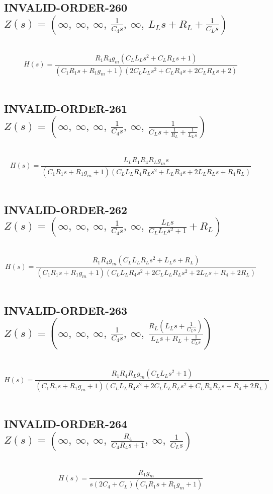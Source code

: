 \documentclass{article}
\begin{document}
\subsection{INVALID-ORDER-260 $Z(s) = \left( \infty, \  \infty, \  \infty, \  \frac{1}{C_{4} s}, \  \infty, \  L_{L} s + R_{L} + \frac{1}{C_{L} s}\right)$ } \ 
\textbf{\[H(s) = \frac{R_{1} R_{4} g_{m} \left(C_{L} L_{L} s^{2} + C_{L} R_{L} s + 1\right)}{\left(C_{1} R_{1} s + R_{1} g_{m} + 1\right) \left(2 C_{L} L_{L} s^{2} + C_{L} R_{4} s + 2 C_{L} R_{L} s + 2\right)}\] } \ 
\subsection{INVALID-ORDER-261 $Z(s) = \left( \infty, \  \infty, \  \infty, \  \frac{1}{C_{4} s}, \  \infty, \  \frac{1}{C_{L} s + \frac{1}{R_{L}} + \frac{1}{L_{L} s}}\right)$ } \ 
\textbf{\[H(s) = \frac{L_{L} R_{1} R_{4} R_{L} g_{m} s}{\left(C_{1} R_{1} s + R_{1} g_{m} + 1\right) \left(C_{L} L_{L} R_{4} R_{L} s^{2} + L_{L} R_{4} s + 2 L_{L} R_{L} s + R_{4} R_{L}\right)}\] } \ 
\subsection{INVALID-ORDER-262 $Z(s) = \left( \infty, \  \infty, \  \infty, \  \frac{1}{C_{4} s}, \  \infty, \  \frac{L_{L} s}{C_{L} L_{L} s^{2} + 1} + R_{L}\right)$ } \ 
\textbf{\[H(s) = \frac{R_{1} R_{4} g_{m} \left(C_{L} L_{L} R_{L} s^{2} + L_{L} s + R_{L}\right)}{\left(C_{1} R_{1} s + R_{1} g_{m} + 1\right) \left(C_{L} L_{L} R_{4} s^{2} + 2 C_{L} L_{L} R_{L} s^{2} + 2 L_{L} s + R_{4} + 2 R_{L}\right)}\] } \ 
\subsection{INVALID-ORDER-263 $Z(s) = \left( \infty, \  \infty, \  \infty, \  \frac{1}{C_{4} s}, \  \infty, \  \frac{R_{L} \left(L_{L} s + \frac{1}{C_{L} s}\right)}{L_{L} s + R_{L} + \frac{1}{C_{L} s}}\right)$ } \ 
\textbf{\[H(s) = \frac{R_{1} R_{4} R_{L} g_{m} \left(C_{L} L_{L} s^{2} + 1\right)}{\left(C_{1} R_{1} s + R_{1} g_{m} + 1\right) \left(C_{L} L_{L} R_{4} s^{2} + 2 C_{L} L_{L} R_{L} s^{2} + C_{L} R_{4} R_{L} s + R_{4} + 2 R_{L}\right)}\] } \ 
\subsection{INVALID-ORDER-264 $Z(s) = \left( \infty, \  \infty, \  \infty, \  \frac{R_{4}}{C_{4} R_{4} s + 1}, \  \infty, \  \frac{1}{C_{L} s}\right)$ } \ 
\textbf{\[H(s) = \frac{R_{1} g_{m}}{s \left(2 C_{4} + C_{L}\right) \left(C_{1} R_{1} s + R_{1} g_{m} + 1\right)}\] } \ 
\end{document}
